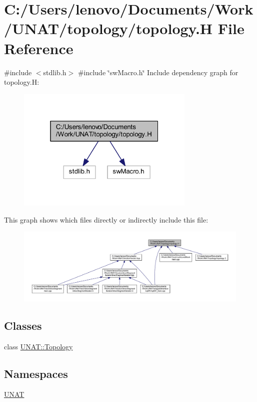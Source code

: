 \hypertarget{topology_2topology_8H}{}\section{C\+:/\+Users/lenovo/\+Documents/\+Work/\+U\+N\+A\+T/topology/topology.H File Reference}
\label{topology_2topology_8H}
{\ttfamily \#include $<$stdlib.\+h$>$}\newline
{\ttfamily \#include \char`\"{}sw\+Macro.\+h\char`\"{}}\newline
Include dependency graph for topology.\+H\+:
\nopagebreak
\begin{figure}[H]
\begin{center}
\leavevmode
\includegraphics[width=241pt]{topology_2topology_8H__incl}
\end{center}
\end{figure}
This graph shows which files directly or indirectly include this file\+:
\nopagebreak
\begin{figure}[H]
\begin{center}
\leavevmode
\includegraphics[width=350pt]{topology_2topology_8H__dep__incl}
\end{center}
\end{figure}
\subsection*{Classes}
\begin{DoxyCompactItemize}
\item 
class \mbox{\hyperlink{classUNAT_1_1Topology}{U\+N\+A\+T\+::\+Topology}}
\end{DoxyCompactItemize}
\subsection*{Namespaces}
\begin{DoxyCompactItemize}
\item 
 \mbox{\hyperlink{namespaceUNAT}{U\+N\+AT}}
\end{DoxyCompactItemize}
